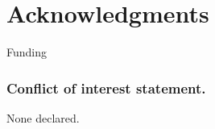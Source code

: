 \documentclass[a4,center,fleqn]{NAR}
\begin{document}
\section{Acknowledgments}
Funding




\subsubsection{Conflict of interest statement.} None declared.
\newpage




%
%
%
%
%
\end{document}
